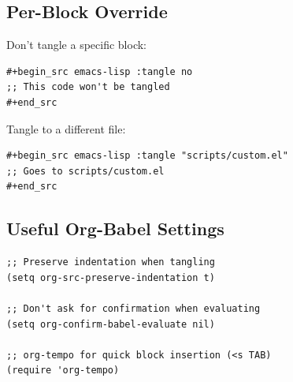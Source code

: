 \documentclass[11pt]{article}
\begin{document}
\subsection{Per-Block Override}
\label{sec:orgf0c8481}

Don't tangle a specific block:

\begin{verbatim}
#+begin_src emacs-lisp :tangle no
;; This code won't be tangled
#+end_src
\end{verbatim}

Tangle to a different file:

\begin{verbatim}
#+begin_src emacs-lisp :tangle "scripts/custom.el"
;; Goes to scripts/custom.el
#+end_src
\end{verbatim}
\subsection{Useful Org-Babel Settings}
\label{sec:org36ba729}

\begin{verbatim}
;; Preserve indentation when tangling
(setq org-src-preserve-indentation t)

;; Don't ask for confirmation when evaluating
(setq org-confirm-babel-evaluate nil)

;; org-tempo for quick block insertion (<s TAB)
(require 'org-tempo)
\end{verbatim}
\end{document}
